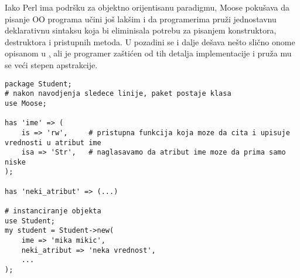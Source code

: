 \documentclass[a4paper]{article}
\begin{document}
Iako Perl ima podršku za objektno orijentisanu paradigmu, Moose pokušava da pisanje OO programa učini još lakšim i da programerima pruži jednostavnu deklarativnu sintaksu koja bi eliminisala potrebu za pisanjem konstruktora, destruktora i pristupnih metoda. U pozadini se i dalje dešava nešto slično onome opisanom u \href{sec:osobine}, ali je programer zaštićen od tih detalja implementacije i pruža mu se veći stepen apstrakcije.

\begin{lstlisting}[caption={Moose klase}, frame=single, label = moose]
package Student;
# nakon navodjenja sledece linije, paket postaje klasa
use Moose;

has 'ime' => (
    is => 'rw',     # pristupna funkcija koja moze da cita i upisuje vrednosti u atribut ime
    isa => 'Str',   # naglasavamo da atribut ime moze da prima samo niske
);

has 'neki_atribut' => (...)

# instanciranje objekta
use Student;
my student = Student->new(
    ime => 'mika mikic',
    neki_atribut => 'neka vrednost',
    ...
);

\end{lstlisting}

\end{document}
